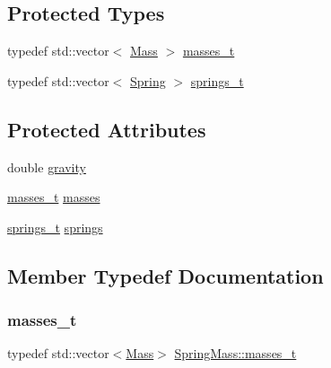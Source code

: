 \subsection*{Protected Types}
\begin{DoxyCompactItemize}
\item 
typedef std\+::vector$<$ \hyperlink{classMass}{Mass} $>$ \hyperlink{classSpringMass_a4871d5df726e2e6b656d1b1c5fdfecbe}{masses\+\_\+t}
\item 
typedef std\+::vector$<$ \hyperlink{classSpring}{Spring} $>$ \hyperlink{classSpringMass_a31c09e1ecad3d85488d557b76eb633e5}{springs\+\_\+t}
\end{DoxyCompactItemize}
\subsection*{Protected Attributes}
\begin{DoxyCompactItemize}
\item 
double \hyperlink{classSpringMass_a8153c487713e1eea29caf109bc49e373}{gravity}
\item 
\hyperlink{classSpringMass_a4871d5df726e2e6b656d1b1c5fdfecbe}{masses\+\_\+t} \hyperlink{classSpringMass_a92b9fedfa5acfae0beb0cbc636407c6f}{masses}
\item 
\hyperlink{classSpringMass_a31c09e1ecad3d85488d557b76eb633e5}{springs\+\_\+t} \hyperlink{classSpringMass_a40cdaa9d3d2a622579d8d8b2b356b69b}{springs}
\end{DoxyCompactItemize}


\subsection{Member Typedef Documentation}
\mbox{\label{classSpringMass_a4871d5df726e2e6b656d1b1c5fdfecbe}} 
\subsubsection{\texorpdfstring{masses\+\_\+t}{masses\_t}}
{\footnotesize\ttfamily typedef std\+::vector$<$\hyperlink{classMass}{Mass}$>$ \hyperlink{classSpringMass_a4871d5df726e2e6b656d1b1c5fdfecbe}{Spring\+Mass\+::masses\+\_\+t}\hspace{0.3cm}{\ttfamily [protected]}}

\mbox{\label{classSpringMass_a31c09e1ecad3d85488d557b76eb633e5}} 
